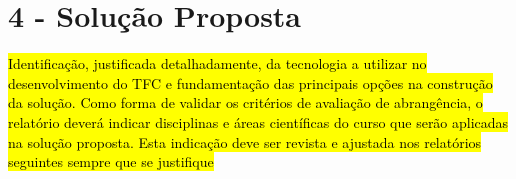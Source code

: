 \chapter*{4 - Solução Proposta}

\hl{Identificação, justificada detalhadamente, da tecnologia a utilizar no desenvolvimento do TFC e fundamentação das principais opções na construção da solução. Como forma de validar os critérios de avaliação de abrangência, o relatório deverá indicar disciplinas e áreas científicas do curso que serão aplicadas na solução proposta. Esta indicação deve ser revista e ajustada nos relatórios seguintes sempre que se justifique}